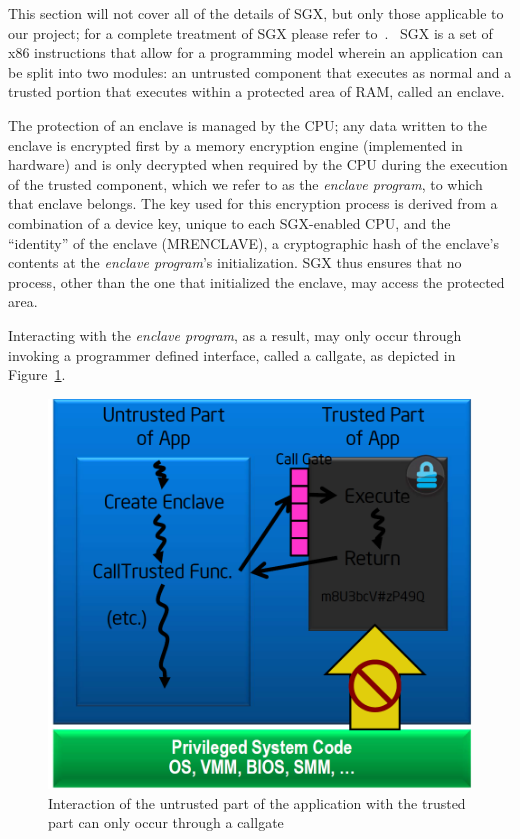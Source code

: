\documentclass[../main.tex]{subfiles}
\begin{document}
This section will not cover all of the details of SGX, but only those
applicable to our project; for a complete treatment of SGX please
refer to~\cite{IntelCorporation2010}. \Intel~SGX is a set of x86
instructions that allow for a programming model wherein an application
can be split into two modules: an untrusted component that executes
as normal and a trusted portion that executes within a protected
area of RAM, called an enclave.

The protection of an enclave is managed by the CPU; any data written
to the enclave is encrypted first by a memory encryption engine
(implemented in hardware) and is only decrypted when required by the
CPU during the execution of the trusted component, which we refer to
as the \textit{enclave program}, to which that enclave belongs. The
key used for this encryption process is derived from a combination of
a device key, unique to each SGX-enabled CPU, and the ``identity'' of
the enclave (MRENCLAVE), a cryptographic hash of the enclave's
contents at the \textit{enclave program}'s initialization. SGX thus
ensures that no process, other than the one that initialized the
enclave, may access the protected area.

Interacting with the \textit{enclave program}, as a result, may only occur
through invoking a programmer defined interface, called a callgate, as
depicted in Figure~\ref{fig:sgxhighlevel}.

\begin{figure}[H]
  \centering
  \includegraphics[scale=0.25]{images/sgxhighlevel.png}
  \caption{Interaction of the untrusted part of the application with
    the trusted part can only occur through a
    callgate~\cite{IntelCorporation2010}}
  \label{fig:sgxhighlevel}
\end{figure}
\end{document}
